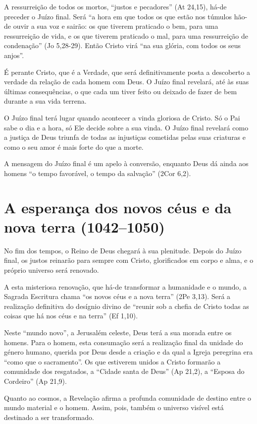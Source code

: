 A ressurreição de todos os mortos, ``justos e pecadores'' (At 24,15), há-de preceder o Juízo final. Será ``a hora em que todos os que estão nos túmulos hão-de ouvir a sua voz e sairão: os que tiverem praticado o bem, para uma ressurreição de vida, e os que tiverem praticado o mal, para uma ressurreição de condenação'' (Jo 5,28-29). Então Cristo virá ``na sua glória, com todos os seus anjos''.

É perante Cristo, que é a Verdade, que será definitivamente posta a descoberto a verdade da relação de cada homem com Deus. O Juízo final revelará, até às suas últimas consequências, o que cada um tiver feito ou deixado de fazer de bem durante a sua vida terrena.

O Juízo final terá lugar quando acontecer a vinda gloriosa de Cristo. Só o Pai sabe o dia e a hora, só Ele decide sobre a sua vinda. O Juízo final revelará como a justiça de Deus triunfa de todas as injustiças cometidas pelas suas criaturas e como o seu amor é mais forte do que a morte.

A mensagem do Juízo final é um apelo à conversão, enquanto Deus dá ainda aos homens ``o tempo favorável, o tempo da salvação'' (2Cor 6,2).

\section{A esperança dos novos céus e da nova terra (1042--1050)}

No fim dos tempos, o Reino de Deus chegará à sua plenitude. Depois do Juízo final, os justos reinarão para sempre com Cristo, glorificados em corpo e alma, e o próprio universo será renovado.

A esta misteriosa renovação, que há-de transformar a humanidade e o mundo, a Sagrada Escritura chama ``os novos céus e a nova terra'' (2Pe 3,13). Será a realização definitiva do desígnio divino de ``reunir sob a chefia de Cristo todas as coisas que há nos céus e na terra'' (Ef 1,10).

Neste ``mundo novo'', a Jerusalém celeste, Deus terá a sua morada entre os homens. Para o homem, esta consumação será a realização final da unidade do género humano, querida por Deus desde a criação e da qual a Igreja peregrina era ``como que o sacramento''. Os que estiverem unidos a Cristo formarão a comunidade dos resgatados, a ``Cidade santa de Deus'' (Ap 21,2), a ``Esposa do Cordeiro'' (Ap 21,9).

Quanto ao cosmos, a Revelação afirma a profunda comunidade de destino entre o mundo material e o homem. Assim, pois, também o universo visível está destinado a ser transformado.

